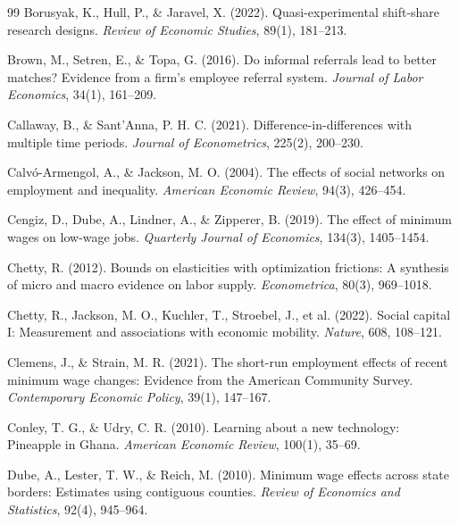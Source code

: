 \documentclass[12pt]{article}
\begin{document}
\begin{thebibliography}{99}
Borusyak, K., Hull, P., \& Jaravel, X. (2022).
Quasi-experimental shift-share research designs.
\textit{Review of Economic Studies}, 89(1), 181--213.

Brown, M., Setren, E., \& Topa, G. (2016).
Do informal referrals lead to better matches? Evidence from a firm's employee referral system.
\textit{Journal of Labor Economics}, 34(1), 161--209.

Callaway, B., \& Sant'Anna, P. H. C. (2021).
Difference-in-differences with multiple time periods.
\textit{Journal of Econometrics}, 225(2), 200--230.

Calv{\'o}-Armengol, A., \& Jackson, M. O. (2004).
The effects of social networks on employment and inequality.
\textit{American Economic Review}, 94(3), 426--454.

Cengiz, D., Dube, A., Lindner, A., \& Zipperer, B. (2019).
The effect of minimum wages on low-wage jobs.
\textit{Quarterly Journal of Economics}, 134(3), 1405--1454.

Chetty, R. (2012).
Bounds on elasticities with optimization frictions: A synthesis of micro and macro evidence on labor supply.
\textit{Econometrica}, 80(3), 969--1018.

Chetty, R., Jackson, M. O., Kuchler, T., Stroebel, J., et al. (2022).
Social capital I: Measurement and associations with economic mobility.
\textit{Nature}, 608, 108--121.

Clemens, J., \& Strain, M. R. (2021).
The short-run employment effects of recent minimum wage changes: Evidence from the American Community Survey.
\textit{Contemporary Economic Policy}, 39(1), 147--167.

Conley, T. G., \& Udry, C. R. (2010).
Learning about a new technology: Pineapple in Ghana.
\textit{American Economic Review}, 100(1), 35--69.

Dube, A., Lester, T. W., \& Reich, M. (2010).
Minimum wage effects across state borders: Estimates using contiguous counties.
\textit{Review of Economics and Statistics}, 92(4), 945--964.


\end{thebibliography}
\end{document}
